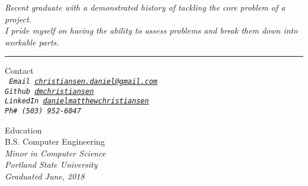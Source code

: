 \documentclass{article}
\newcommand\leftcolwidthvar{0.35}
\begin{document}
\begin{center}
\textsf{\textit{%
Recent graduate with a demonstrated history of tackling the core problem of a project.\\
I pride myself on having the ability to assess problems and break them down into workable parts.}}
\end{center}
\begin{center}
\rule{0.80\textwidth}{.4pt}
\end{center}
\medskip
%
%
\noindent
\colorbox{light-gray}{%
\begin{minipage}[t]{\leftcolwidthvar \textwidth}
%
%
\begin{flushleft}
\textsf{\Large Contact}\\
\smallskip
\texttt{\textit{%
Email \href{mailto:christiansen.daniel@gmail.com}{christiansen.daniel@gmail.com}\\
Github \href{https://github.com/dmchristiansen}{dmchristiansen}\\
LinkedIn \href{https://www.linkedin.com/in/danielmatthewchristiansen/}{danielmatthewchristiansen}\\
Ph\# (503) 952-6047\\}}
\end{flushleft}
%
%
\vspace{0.5ex}
\begin{flushleft}
\textsf{\Large Education}\\
\smallskip
B.S. Computer Engineering\\ 
\textsf{\textit{%
Minor in Computer Science\\
Portland State University\\
Graduated June, 2018\\}}
\end{flushleft}
%
%
\vspace{0.5ex}
\end{minipage}}
\end{document}
